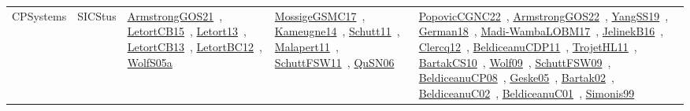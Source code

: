 {\begin{longtable}{lp{3cm}>{\raggedright\arraybackslash}p{6cm}>{\raggedright\arraybackslash}p{6cm}>{\raggedright\arraybackslash}p{8cm}}
CPSystems & SICStus & \href{../works/ArmstrongGOS21.pdf}{ArmstrongGOS21}~\cite{ArmstrongGOS21}, \href{../works/LetortCB15.pdf}{LetortCB15}~\cite{LetortCB15}, \href{../works/Letort13.pdf}{Letort13}~\cite{Letort13}, \href{../works/LetortCB13.pdf}{LetortCB13}~\cite{LetortCB13}, \href{../works/LetortBC12.pdf}{LetortBC12}~\cite{LetortBC12}, \href{../works/WolfS05a.pdf}{WolfS05a}~\cite{WolfS05a} & \href{../works/MossigeGSMC17.pdf}{MossigeGSMC17}~\cite{MossigeGSMC17}, \href{../works/Kameugne14.pdf}{Kameugne14}~\cite{Kameugne14}, \href{../works/Schutt11.pdf}{Schutt11}~\cite{Schutt11}, \href{../works/Malapert11.pdf}{Malapert11}~\cite{Malapert11}, \href{../works/SchuttFSW11.pdf}{SchuttFSW11}~\cite{SchuttFSW11}, \href{../works/QuSN06.pdf}{QuSN06}~\cite{QuSN06} & \href{../works/PopovicCGNC22.pdf}{PopovicCGNC22}~\cite{PopovicCGNC22}, \href{../works/ArmstrongGOS22.pdf}{ArmstrongGOS22}~\cite{ArmstrongGOS22}, \href{../works/YangSS19.pdf}{YangSS19}~\cite{YangSS19}, \href{../works/German18.pdf}{German18}~\cite{German18}, \href{../works/Madi-WambaLOBM17.pdf}{Madi-WambaLOBM17}~\cite{Madi-WambaLOBM17}, \href{../works/JelinekB16.pdf}{JelinekB16}~\cite{JelinekB16}, \href{../works/Clercq12.pdf}{Clercq12}~\cite{Clercq12}, \href{../works/BeldiceanuCDP11.pdf}{BeldiceanuCDP11}~\cite{BeldiceanuCDP11}, \href{../works/TrojetHL11.pdf}{TrojetHL11}~\cite{TrojetHL11}, \href{../works/BartakCS10.pdf}{BartakCS10}~\cite{BartakCS10}, \href{../works/Wolf09.pdf}{Wolf09}~\cite{Wolf09}, \href{../works/SchuttFSW09.pdf}{SchuttFSW09}~\cite{SchuttFSW09}, \href{../works/BeldiceanuCP08.pdf}{BeldiceanuCP08}~\cite{BeldiceanuCP08}, \href{../works/Geske05.pdf}{Geske05}~\cite{Geske05}, \href{../works/Bartak02.pdf}{Bartak02}~\cite{Bartak02}, \href{../works/BeldiceanuC02.pdf}{BeldiceanuC02}~\cite{BeldiceanuC02}, \href{../works/BeldiceanuC01.pdf}{BeldiceanuC01}~\cite{BeldiceanuC01}, \href{../works/Simonis99.pdf}{Simonis99}~\cite{Simonis99}\\

\end{longtable}}
